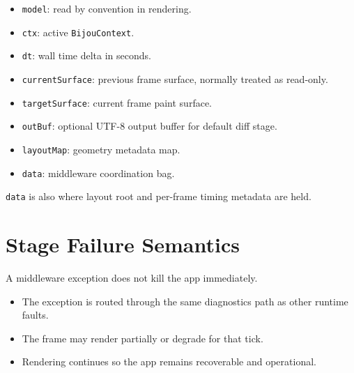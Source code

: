 \begin{itemize}
\tightlist
\item
  \texttt{m\allowbreak{}o\allowbreak{}d\allowbreak{}e\allowbreak{}l}: read by convention in rendering.
\item
  \texttt{c\allowbreak{}t\allowbreak{}x}: active \texttt{B\allowbreak{}i\allowbreak{}j\allowbreak{}o\allowbreak{}u\allowbreak{}C\allowbreak{}o\allowbreak{}n\allowbreak{}t\allowbreak{}e\allowbreak{}x\allowbreak{}t}.
\item
  \texttt{d\allowbreak{}t}: wall time delta in seconds.
\item
  \texttt{c\allowbreak{}u\allowbreak{}r\allowbreak{}r\allowbreak{}e\allowbreak{}n\allowbreak{}t\allowbreak{}S\allowbreak{}u\allowbreak{}r\allowbreak{}f\allowbreak{}a\allowbreak{}c\allowbreak{}e}: previous frame surface, normally treated as read-only.
\item
  \texttt{t\allowbreak{}a\allowbreak{}r\allowbreak{}g\allowbreak{}e\allowbreak{}t\allowbreak{}S\allowbreak{}u\allowbreak{}r\allowbreak{}f\allowbreak{}a\allowbreak{}c\allowbreak{}e}: current frame paint surface.
\item
  \texttt{o\allowbreak{}u\allowbreak{}t\allowbreak{}B\allowbreak{}u\allowbreak{}f}: optional UTF-8 output buffer for default diff stage.
\item
  \texttt{l\allowbreak{}a\allowbreak{}y\allowbreak{}o\allowbreak{}u\allowbreak{}t\allowbreak{}M\allowbreak{}a\allowbreak{}p}: geometry metadata map.
\item
  \texttt{d\allowbreak{}a\allowbreak{}t\allowbreak{}a}: middleware coordination bag.
\end{itemize}

\texttt{d\allowbreak{}a\allowbreak{}t\allowbreak{}a} is also where layout root and per-frame timing metadata are held.

\section{Stage Failure Semantics}\label{record-014-stage-failure-semantics}

A middleware exception does not kill the app immediately.

\begin{itemize}
\tightlist
\item
  The exception is routed through the same diagnostics path as other runtime faults.
\item
  The frame may render partially or degrade for that tick.
\item
  Rendering continues so the app remains recoverable and operational.
\end{itemize}

